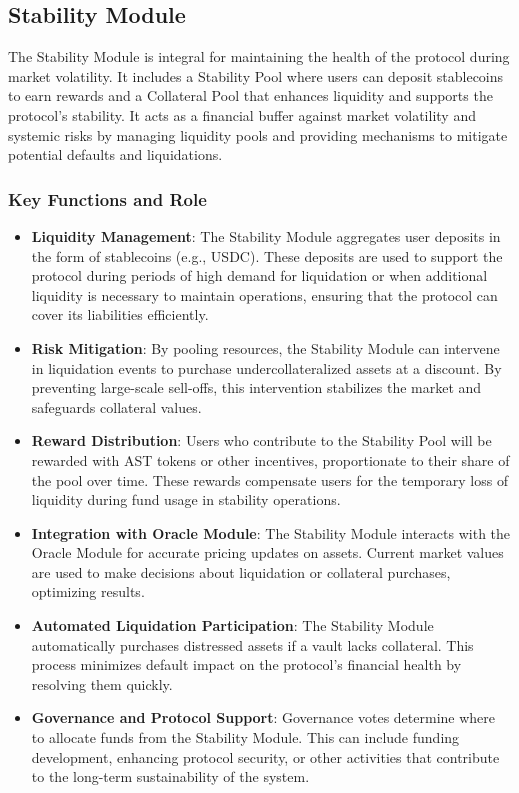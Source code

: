 \subsection{Stability Module}
The Stability Module is integral for maintaining the health of the protocol during market volatility. It includes a Stability Pool where users can deposit stablecoins to earn rewards and a Collateral Pool that enhances liquidity and supports the protocol's stability. It acts as a financial buffer against market volatility and systemic risks by managing liquidity pools and providing mechanisms to mitigate potential defaults and liquidations.

\subsubsection{Key Functions and Role}
\begin{itemize}
    \item \textbf{Liquidity Management}: The Stability Module aggregates user deposits in the form of stablecoins (e.g., USDC). These deposits are used to support the protocol during periods of high demand for liquidation or when additional liquidity is necessary to maintain operations, ensuring that the protocol can cover its liabilities efficiently.
    \item \textbf{Risk Mitigation}: By pooling resources, the Stability Module can intervene in liquidation events to purchase undercollateralized assets at a discount. By preventing large-scale sell-offs, this intervention stabilizes the market and safeguards collateral values.
    \item \textbf{Reward Distribution}: Users who contribute to the Stability Pool will be rewarded with AST tokens or other incentives, proportionate to their share of the pool over time. These rewards compensate users for the temporary loss of liquidity during fund usage in stability operations.
    \item \textbf{Integration with Oracle Module}: The Stability Module interacts with the Oracle Module for accurate pricing updates on assets. Current market values are used to make decisions about liquidation or collateral purchases, optimizing results.
    \item \textbf{Automated Liquidation Participation}: The Stability Module automatically purchases distressed assets if a vault lacks collateral. This process minimizes default impact on the protocol's financial health by resolving them quickly.
    \item \textbf{Governance and Protocol Support}: Governance votes determine where to allocate funds from the Stability Module. This can include funding development, enhancing protocol security, or other activities that contribute to the long-term sustainability of the system.
\end{itemize}

